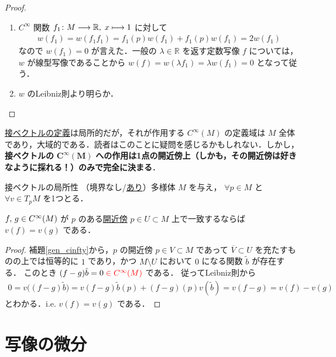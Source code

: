 \documentclass[geometry_main]{subfiles}
\begin{document}
\begin{proof}
	\begin{enumerate}
		\item $C^\infty$ 関数 $f_1 \colon M \longrightarrow \mathbb{R},\; x \longmapsto 1$ に対して
		\begin{align}
			w(f_1) = w(f_1f_1) = f_1(p) w(f_1) + f_1(p) w(f_1) = 2 w(f_1)
		\end{align}
		なので $w(f_1) = 0$ が言えた．一般の $\lambda \in \mathbb{R}$ を返す定数写像 $f$ については，$w$ が線型写像であることから $w(f) = w(\lambda f_1) = \lambda w(f_1) = 0$ となって従う．
		\item $w$ のLeibniz則より明らか．
	\end{enumerate}
\end{proof}

\hyperref[def.tangentv]{接ベクトルの定義}は局所的だが，それが作用する $C^\infty (M)$ の定義域は $M$ 全体であり，大域的である．読者はこのことに疑問を感じるかもしれない．しかし，\textbf{接ベクトルの} $\bm{C^\infty(M)}$ \textbf{への作用は1点の開近傍上（しかも，その開近傍は好きなように採れる！）のみで完全に決まる}．

\begin{myprop}[label=prop:tangentv-local]{接ベクトルの局所性}
	（境界なし/\hyperref[def:mani-with-boundary]{あり}）\cinfty 多様体 $M$ を与え，
	$\forall p \in M$ と $\forall v \in T_pM$ を1つとる．

	$f,\, g \in C^\infty(M)$ が $p$ のある\hyperref[def:neighborhood]{開近傍} $p \in U \subset M$ 上で一致するならば $v(f) = v(g)$ である．
\end{myprop}

\begin{proof}
	補題\ref{gen_cinfty}から，$p$ の開近傍 $p \in V \subset M$ であって $\overline{V} \subset U$ を充たすものの上では恒等的に $1$ であり，かつ $M \setminus U$ において $0$ になる\cinfty 関数 $\tilde{b}$ が存在する．
	このとき $(f - g)\tilde{b} = 0 \; \textcolor{red}{\in C^\infty(M)}$ である．
	従ってLeibniz則から
	\begin{align}
		0 = v\bigl( (f-g)\tilde{b} \bigr) = v(f-g) \tilde{b}(p) + (f-g)(p) v(\tilde{b})= v(f-g) = v(f) - v(g)
	\end{align}
	とわかる．i.e. $v(f) = v(g)$ である．
\end{proof}

\section{\cinfty 写像の微分}
\end{document}
